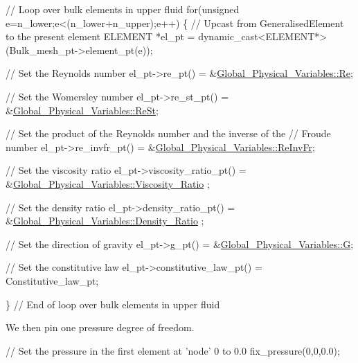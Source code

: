 \begin{DoxyCodeInclude}
 \textcolor{comment}{// Loop over bulk elements in upper fluid}
 \textcolor{keywordflow}{for}(\textcolor{keywordtype}{unsigned} e=n\_lower;e<(n\_lower+n\_upper);e++)
  \{
   \textcolor{comment}{// Upcast from GeneralisedElement to the present element}
   ELEMENT *el\_pt = \textcolor{keyword}{dynamic\_cast<}ELEMENT*\textcolor{keyword}{>}(Bulk\_mesh\_pt->element\_pt(e));

   \textcolor{comment}{// Set the Reynolds number}
   el\_pt->re\_pt() = &\hyperlink{namespaceGlobal__Physical__Variables_ab814e627d2eb5bc50318879d19ab16b9}{Global\_Physical\_Variables::Re};

   \textcolor{comment}{// Set the Womersley number}
   el\_pt->re\_st\_pt() = &\hyperlink{namespaceGlobal__Physical__Variables_a085ee4bf968ffdd01a41b8c41864f907}{Global\_Physical\_Variables::ReSt};

   \textcolor{comment}{// Set the product of the Reynolds number and the inverse of the}
   \textcolor{comment}{// Froude number}
   el\_pt->re\_invfr\_pt() = &\hyperlink{namespaceGlobal__Physical__Variables_aa6286f02b476912dd7550eced538331a}{Global\_Physical\_Variables::ReInvFr};

   \textcolor{comment}{// Set the viscosity ratio}
   el\_pt->viscosity\_ratio\_pt() = &\hyperlink{namespaceGlobal__Physical__Variables_adb51428300a01b19395c43c0d3586d6f}{Global\_Physical\_Variables::Viscosity\_Ratio}
      ;

   \textcolor{comment}{// Set the density ratio}
   el\_pt->density\_ratio\_pt() = &\hyperlink{namespaceGlobal__Physical__Variables_a80a34b6dfb7e1501966b8d6c7501e718}{Global\_Physical\_Variables::Density\_Ratio}
      ;

   \textcolor{comment}{// Set the direction of gravity}
   el\_pt->g\_pt() = &\hyperlink{namespaceGlobal__Physical__Variables_a37a6f46efcb35b4bd12c73f19d741020}{Global\_Physical\_Variables::G};

   \textcolor{comment}{// Set the constitutive law}
   el\_pt->constitutive\_law\_pt() = Constitutive\_law\_pt;

  \} \textcolor{comment}{// End of loop over bulk elements in upper fluid}

\end{DoxyCodeInclude}


We then pin one pressure degree of freedom.


\begin{DoxyCodeInclude}
 \textcolor{comment}{// Set the pressure in the first element at 'node' 0 to 0.0}
 fix\_pressure(0,0,0.0);

\end{DoxyCodeInclude}


